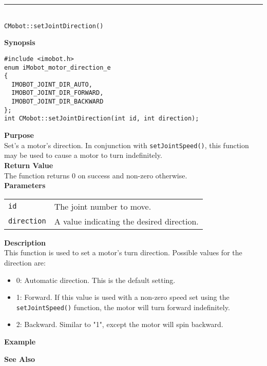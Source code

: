 \noindent
\vspace{5pt}
\rule{4.5in}{0.015in}\\
\noindent
{\LARGE \texttt{CMobot::setJointDirection()}}\\
{}

\noindent
{\bf Synopsis}\\
\begin{verbatim}
#include <imobot.h>
enum iMobot_motor_direction_e
{
  IMOBOT_JOINT_DIR_AUTO,
  IMOBOT_JOINT_DIR_FORWARD,
  IMOBOT_JOINT_DIR_BACKWARD
};
int CMobot::setJointDirection(int id, int direction);
\end{verbatim}

\noindent
{\bf Purpose}\\
Set's a motor's direction. In conjunction with \texttt{setJointSpeed()}, this
function may be used to cause a motor to turn indefinitely.\\

\noindent
{\bf Return Value}\\
The function returns 0 on success and non-zero otherwise.\\

\noindent
{\bf Parameters}
\vspace{-0.1in}
\begin{description}
\item               
\begin{tabular}{p{20 mm}p{145 mm}}
\texttt{id} & The joint number to move. \\
\texttt{direction} & A value indicating the desired direction.
\end{tabular}
\end{description}

\noindent
{\bf Description}\\
This function is used to set a motor's turn direction. Possible values for the
direction are:
\begin{itemize}
\item 0: Automatic direction. This is the default setting. 
\item 1: Forward. If this value is used with a non-zero speed set using the
\texttt{setJointSpeed()} function, the motor will turn forward indefinitely.
\item 2: Backward. Similar to "1", except the motor will spin backward.
\end{itemize}

\noindent
{\bf Example}\\
\noindent

\noindent
{\bf See Also}\\

